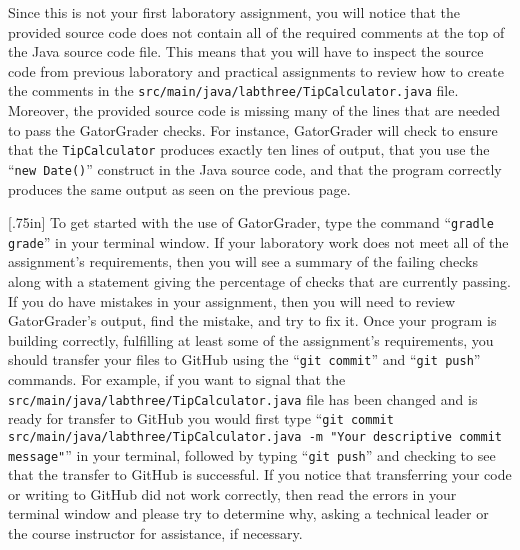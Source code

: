 \documentclass[11pt]{article}
\newcommand{\mainprogram}{\lstinline{TipCalculator}}
\newcommand{\mainprogramsource}{\lstinline{src/main/java/labthree/TipCalculator.java}}
\newcommand{\gatorgraderstart}{\command{gradle grade}}
\newcommand{\gatorgradercheck}{\command{gradle grade}}
\newcommand{\gitcommit}{\command{git commit}}
\newcommand{\gitpush}{\command{git push}}
\newcommand{\gitcommitmainprogram}{\command{git commit src/main/java/labthree/TipCalculator.java -m "Your
descriptive commit message"}}
\newcommand{\command}[1]{``\lstinline{#1}''}
\newcommand{\caution}[1]{\null\hfill\LARGE{\faWarning{}}\newline\scriptsize{\em{#1}}}
\begin{document}
Since this is not your first laboratory assignment, you will notice that the
provided source code does not contain all of the required comments at the top of
the Java source code file. This means that you will have to inspect the source
code from previous laboratory and practical assignments to review how to create
the comments in the \mainprogramsource{} file. Moreover, the provided source
code is missing many of the lines that are needed to pass the GatorGrader
checks. For instance, GatorGrader will check to ensure that the \mainprogram{}
produces exactly ten lines of output, that you use the \command{new Date()}
construct in the Java source code, and that the program correctly produces the
same output as seen on the previous page.

\marginnote{\caution{Write useful commits}}[.75in] To get started with the use
of GatorGrader, type the command \gatorgraderstart{} in your terminal window. If
your laboratory work does not meet all of the assignment's requirements, then
you will see a summary of the failing checks along with a statement giving the
percentage of checks that are currently passing. If you do have mistakes in your
assignment, then you will need to review GatorGrader's output, find the mistake,
and try to fix it. Once your program is building correctly, fulfilling at least
some of the assignment's requirements, you should transfer your files to GitHub
using the \gitcommit{} and \gitpush{} commands. For example, if you want to
signal that the \mainprogramsource{} file has been changed and is ready for
transfer to GitHub you would first type \gitcommitmainprogram{} in your
terminal, followed by typing \gitpush{} and checking to see that the transfer to
GitHub is successful. If you notice that transferring your code or writing to
GitHub did not work correctly, then read the errors in your terminal window and
please try to determine why, asking a technical leader or the course
instructor for assistance, if necessary.

\end{document}
